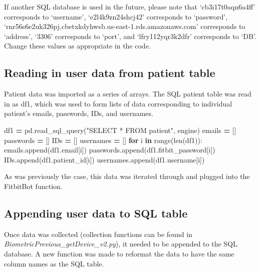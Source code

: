 \documentclass[]{book}
\newenvironment{Shaded}{\begin{snugshade}}{\end{snugshade}}
\newcommand{\KeywordTok}[1]{\textcolor[rgb]{0.13,0.29,0.53}{\textbf{#1}}}
\newcommand{\StringTok}[1]{\textcolor[rgb]{0.31,0.60,0.02}{#1}}
\newcommand{\ControlFlowTok}[1]{\textcolor[rgb]{0.13,0.29,0.53}{\textbf{#1}}}
\newcommand{\OperatorTok}[1]{\textcolor[rgb]{0.81,0.36,0.00}{\textbf{#1}}}
\newcommand{\BuiltInTok}[1]{#1}
\newcommand{\NormalTok}[1]{#1}
\begin{document}
If another SQL database is used in the future, please note that
`cb3i17t0aqn6a4ff' corresponds to `username', `e2l4k9zn24shcj42'
corresponds to `password',
`rnr56s6e2uk326pj.cbetxkdyhwsb.us-east-1.rds.amazonaws.com' corresponds
to `address', `3306' corresponds to `port', and `lfry112yqr3k2dfr'
corresponds to `DB'. Change these values as appropriate in the code.

\subsection{Reading in user data from patient
table}\label{reading-in-user-data-from-patient-table}

Patient data was imported as a series of arrays. The SQL patient table
was read in as df1, which was used to form lists of data corresponding
to individual patient's emails, passwords, IDs, and usernames.

\begin{Shaded}
\begin{Highlighting}[]
\NormalTok{df1 }\OperatorTok{=}\NormalTok{ pd.read_sql_query(}\StringTok{"SELECT * FROM patient"}\NormalTok{, engine)}
\NormalTok{emails }\OperatorTok{=}\NormalTok{ []}
\NormalTok{passwords }\OperatorTok{=}\NormalTok{ []}
\NormalTok{IDs }\OperatorTok{=}\NormalTok{ []}
\NormalTok{usernames }\OperatorTok{=}\NormalTok{ []}
\ControlFlowTok{for}\NormalTok{ i }\KeywordTok{in} \BuiltInTok{range}\NormalTok{(}\BuiltInTok{len}\NormalTok{(df1)):}
\NormalTok{    emails.append(df1.email[i])}
\NormalTok{    passwords.append(df1.fitbit_password[i])}
\NormalTok{    IDs.append(df1.patient_id[i])}
\NormalTok{    usernames.append(df1.username[i])}
\end{Highlighting}
\end{Shaded}

As was previously the case, this data was iterated through and plugged
into the FitbitBot function.

\subsection{Appending user data to SQL
table}\label{appending-user-data-to-sql-table}

Once data was collected (collection functions can be found in
\emph{BiometricPrevious\_getDevice\_v2.py}), it needed to be appended to
the SQL database. A new function was made to reformat the data to have
the same column names as the SQL table.
\end{document}
